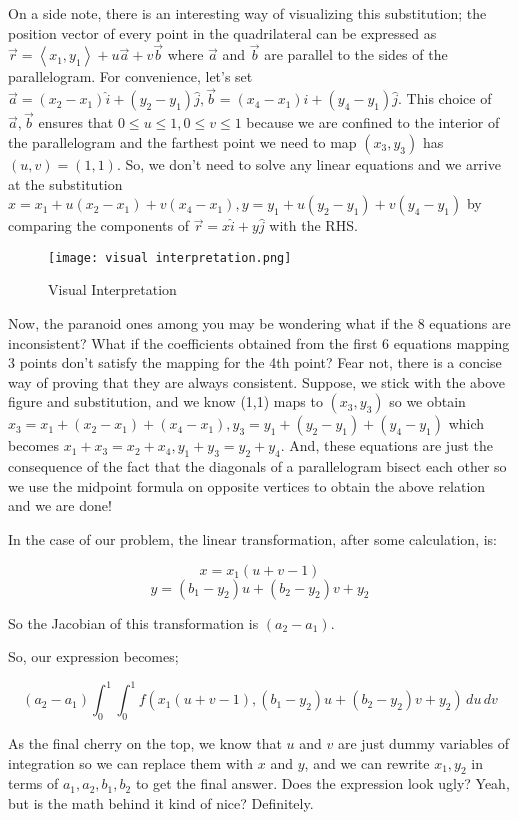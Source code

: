\documentclass{article}
\begin{document}
On a side note, there is an interesting way of visualizing this substitution; the position vector of every point in the quadrilateral can be expressed as $\vec{r}= \left<x_1,y_1\right>+u\vec{a}+v\vec{b}$ where $\vec{a}$ and $\vec{b}$ are parallel to the sides of the parallelogram. For convenience, let's set $\vec{a}=(x_2-x_1)\hat{i}+(y_2-y_1)\hat{j}, \vec{b}=(x_4-x_1)\hat{i}+(y_4-y_1)\hat{j}$. This choice of $\vec{a},\vec{b}$ ensures that $0 \leq u \leq 1, 0 \leq v \leq 1$ because we are confined to the interior of the parallelogram and the farthest point we need to map $(x_3,y_3)$ has $(u,v)=(1,1)$. So, we don't need to solve any linear equations and we arrive at the substitution $x=x_1+u(x_2-x_1)+v(x_4-x_1),y=y_1+u(y_2-y_1)+v(y_4-y_1)$ by comparing the components of $\vec{r}=x \hat{i}+y\hat{j}$ with the RHS.
\newline
\begin{figure}[h]
    \centering
    \texttt{[image: visual interpretation.png]}
    \caption{Visual Interpretation}
    \label{fig:enter-label}
\end{figure}

Now, the paranoid ones among you may be wondering what if the 8 equations are inconsistent? What if the coefficients obtained from the first 6 equations mapping 3 points don't satisfy the mapping for the 4th point? Fear not, there is a concise way of proving that they are always consistent. Suppose, we stick with the above figure and substitution, and we know (1,1) maps to $(x_3,y_3)$ so we obtain $x_3=x_1+(x_2-x_1)+(x_4-x_1),y_3=y_1+(y_2-y_1)+(y_4-y_1)$ which becomes $x_1+x_3=x_2+x_4, y_1+y_3=y_2+y_4$. And, these equations are just the consequence of the fact that the diagonals of a parallelogram bisect each other so we use the midpoint formula on opposite vertices to obtain the above relation and we are done! 

In the case of our problem, the linear transformation, after some calculation, is:

$$x=x_1(u+v-1)$$
$$y=(b_1-y_2)u+(b_2-y_2)v + y_2$$

So the Jacobian of this transformation is $(a_2-a_1)$.

So, our expression becomes;

$$(a_2-a_1)\int_0^1 \int_0^1 f \left(x_1(u+v-1), (b_1-y_2)u+(b_2-y_2)v+y_2 \right)\, du \, dv $$

As the final cherry on the top, we know that $u$ and $v$ are just dummy variables of integration so we can replace them with $x$ and $y$, and we can rewrite $x_1,y_2$ in terms of $a_1,a_2,b_1,b_2$ to get the final answer. Does the expression look ugly? Yeah, but is the math behind it kind of nice? Definitely.
\end{document}

